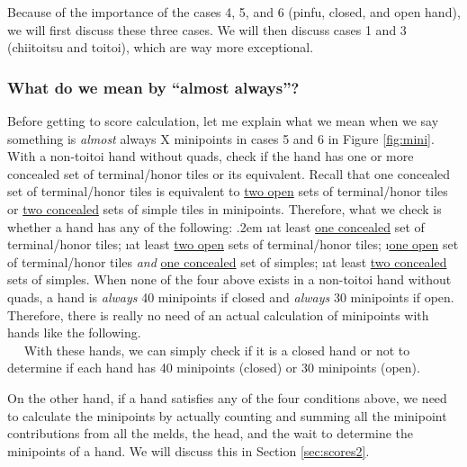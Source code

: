 \bigskip
Because of the importance of the cases 4, 5, and 6 ({\jap pinfu}, closed, and open hand), we will first discuss these three cases. We will then discuss cases 1 and 3 ({\jap chiitoitsu} and {\jap toitoi}), which are way more exceptional. 

\subsubsection{What do we mean by ``almost always''?}
Before getting to score calculation, let me explain what we mean when we say something is \emph{almost} always X minipoints in cases 5 and 6 in Figure \ref{fig:mini}. 
With a non-{\jap toitoi} hand without quads, check if the hand has one or more concealed set of terminal/honor tiles or its equivalent. Recall that one concealed set of terminal/honor tiles is equivalent to \underline{two open} sets of terminal/honor tiles or \underline{two concealed} sets of simple tiles in minipoints. 
Therefore, what we check is whether a hand has any of the following:
\bi \itemsep.2em
\i at least \underline{one concealed} set of terminal/honor tiles;
\i at least \underline{two open} sets of terminal/honor tiles;
\i \underline{one open} set of terminal/honor tiles \emph{and} 
\underline{one concealed} set of simples;
\i at least \underline{two concealed} sets of simples.
\ei
When none of the four above exists in a non-{\jap toitoi} hand without quads, a hand is \emph{always} 40 minipoints if closed and \emph{always} 30 minipoints if open. Therefore, there is really no need of an actual calculation of minipoints with hands like the following. 
\bp
{}~\zhong\rzhong\zhong\\
~\rdong\dong\dong~
\ep
With these hands, we can simply check if it is a closed hand or not to determine if each hand has 40 minipoints (closed) or 30 minipoints (open). 

\bigskip
On the other hand, if a hand satisfies any of the four conditions above, we need to calculate the minipoints by actually counting and summing all the minipoint contributions from all the melds, the head, and the wait to determine the minipoints of a hand. We will discuss this in Section \ref{sec:scores2}.  


